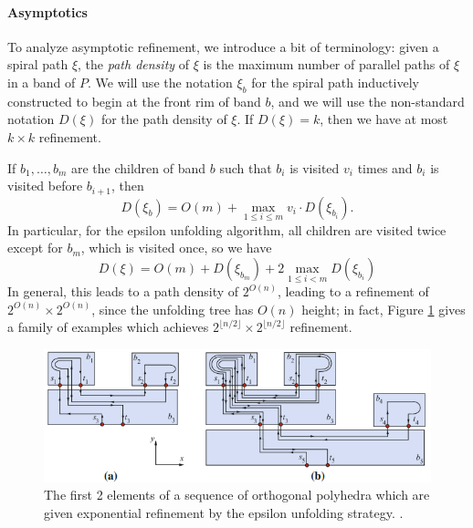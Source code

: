 \documentclass{article}
\begin{document}
\paragraph{Asymptotics}
To analyze asymptotic refinement, we introduce a bit of terminology:
given a spiral path $\xi$, the \emph{path density} of $\xi$ is the maximum number of parallel paths of $\xi$ in a band of $P$.
We will use the notation $\xi_b$ for the spiral path inductively constructed to begin at the front rim of band $b$, and we will use the non-standard notation $D(\xi)$ for the path density of $\xi$.
If $D(\xi) = k$, then we have at most $k \times k$ refinement.


If $b_1,\dots,b_m$ are the children of band $b$ such that $b_i$ is visited $v_i$ times and $b_i$ is visited before $b_{i+1}$, then
\begin{equation}\label{Epsilon delta recursion equation}
  D(\xi_b) = O(m) + \max_{1 \leq i \leq m} v_i \cdot D(\xi_{b_i}).
\end{equation}
In particular, for the epsilon unfolding algorithm, all children are visited twice except for $b_m$, which is visited once, so we have
\[
  D(\xi) = O(m) + D(\xi_{b_m}) + 2\max_{1 \leq i < m} D(\xi_{b_i})
\]  
In general, this leads to a path density of $2^{O(n)}$, leading to a refinement of $2^{O(n)} \times 2^{O(n)}$, since the unfolding tree has $O(n)$ height;
in fact, Figure \ref{Exponential refinement figure} gives a family of examples which achieves $2^{\lfloor n/2 \rfloor} \times 2^{\lfloor n/2 \rfloor}$ refinement.
\begin{figure}
  \begin{center}
    \includegraphics[width=\textwidth]{./figs/Exponential_path_density.png} 
  \end{center}
  \caption{
    The first 2 elements of a sequence of orthogonal polyhedra which are given exponential refinement by the epsilon unfolding strategy. \cite[Fig. 7]{Damian_Flatland_Orourke}.
  }\label{Exponential refinement figure}
\end{figure}
\end{document}
